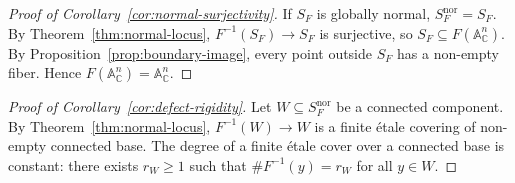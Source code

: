 \documentclass[11pt,reqno]{amsart}
\theoremstyle{plain}
\theoremstyle{definition}
\numberwithin{equation}{section}
\newcommand{\A}{\mathbb{A}}
\newcommand{\C}{\mathbb{C}}
\begin{document}
\begin{proof}[Proof of Corollary~\ref{cor:normal-surjectivity}]
If $S_F$ is globally normal, $S_F^{\mathrm{nor}} = S_F$. By Theorem~\ref{thm:normal-locus}, $F^{-1}(S_F) \to S_F$ is surjective, so $S_F \subseteq F(\A^n_\C)$. By Proposition~\ref{prop:boundary-image}, every point outside $S_F$ has a non-empty fiber. Hence $F(\A^n_\C) = \A^n_\C$.
\end{proof}

\begin{proof}[Proof of Corollary~\ref{cor:defect-rigidity}]
Let $W \subseteq S_F^{\mathrm{nor}}$ be a connected component. By Theorem~\ref{thm:normal-locus}, $F^{-1}(W) \to W$ is a finite \'{e}tale covering of non-empty connected base. The degree of a finite \'{e}tale cover over a connected base is constant: there exists $r_W \ge 1$ such that $\#F^{-1}(y) = r_W$ for all $y \in W$.
\end{proof}
\end{document}
